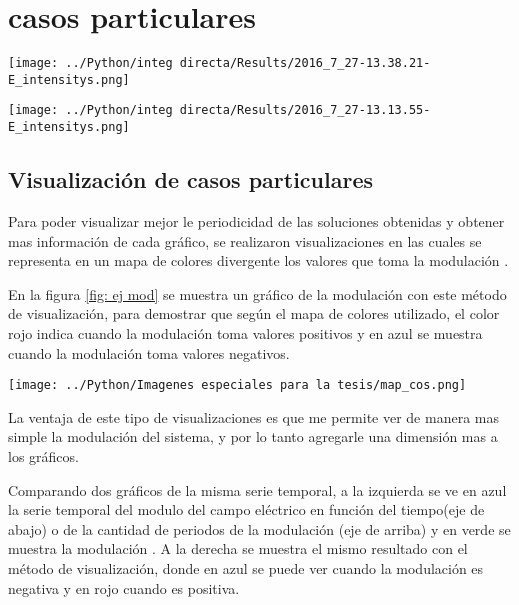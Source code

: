 \section{casos particulares}

	
	\begin{center}
		\texttt{[image: ../Python/integ directa/Results/2016\_7\_27-13.38.21-E\_intensitys.png]}
	\end{center}


	
	\begin{center}
		\texttt{[image: ../Python/integ directa/Results/2016\_7\_27-13.13.55-E\_intensitys.png]}
	\end{center}

	\subsection{Visualización de casos particulares }
	
	Para poder visualizar mejor le periodicidad de las soluciones obtenidas y obtener mas información de cada gráfico, se realizaron visualizaciones en las cuales se representa en un mapa de colores divergente los valores que toma la modulación .
	
	En la figura \ref{fig: ej mod} se muestra un gráfico de la modulación con este método de visualización, para demostrar que según el mapa de colores utilizado, el color rojo indica cuando la modulación toma valores positivos y en azul se muestra cuando la modulación toma valores negativos.
	
	
	\begin{center}
		\texttt{[image: ../Python/Imagenes especiales para la tesis/map\_cos.png]}
	\end{center}
	
	La ventaja de este tipo de visualizaciones es que me permite ver de manera mas simple la modulación del sistema, y por lo tanto agregarle una dimensión mas a los gráficos.
	
	Comparando dos gráficos de la misma serie temporal, a la izquierda se ve en azul la serie temporal del modulo del campo eléctrico en función del tiempo(eje de abajo) o de la cantidad de periodos de la modulación (eje de arriba) y en verde se muestra la modulación . A la derecha se muestra el mismo resultado con el método de visualización, donde en azul se puede ver cuando la modulación es negativa y en rojo cuando es positiva.
	
